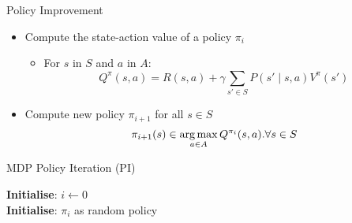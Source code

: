 \documentclass[aspectratio=169]{../latex_main/tntbeamer}  %
\begin{document}
\begin{frame}[c]{Policy Improvement}

\begin{itemize}
	\item Compute the state-action value of a policy $\pi_i$
	\begin{itemize}
		\item For $s$ in $S$ and $a$ in $A$:
				$$Q^\pi(s,a) = R(s,a) + \gamma \sum_{s' \in S} P(s' \mid s,a) V^\pi(s')$$
	\end{itemize}
	\medskip
	\pause
	\item Compute new policy $\pi_{i+1}$ for all $s\in S$
	$$ \pi_{i+1}(s) \in \operatorname*{arg\,max}_{a\in A} Q^{\pi_i} (s,a). \forall s \in S $$
	

\end{itemize}

\end{frame}
\begin{frame}[c]{MDP Policy Iteration (PI)}

\begin{algorithm}[H]
  \caption{Policy Iteration}
  \DontPrintSemicolon
  \textbf{Initialise}: $i \leftarrow 0$\\
  \textbf{Initialise}: $\pi_i$ as random policy\\
\end{algorithm}

\end{frame}
\end{document}
